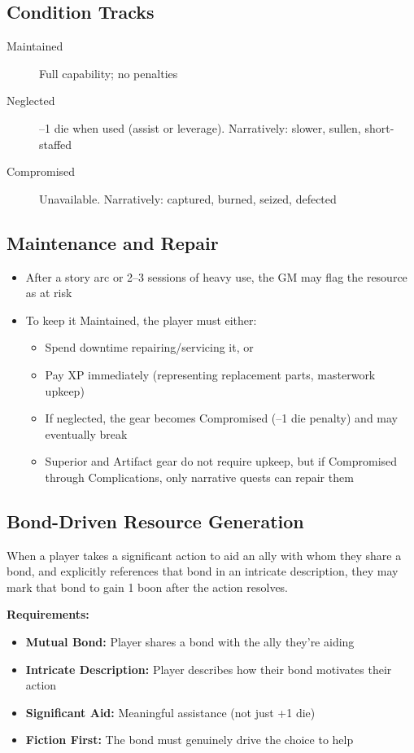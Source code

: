 \subsection{Condition Tracks}

\begin{description}
\item[Maintained] Full capability; no penalties
\item[Neglected] --1 die when used (assist or leverage). Narratively: slower, sullen, short-staffed
\item[Compromised] Unavailable. Narratively: captured, burned, seized, defected
\end{description}

\subsection{Maintenance and Repair}

\begin{itemize}
\item After a story arc or 2--3 sessions of heavy use, the GM may flag the resource as at risk
\item To keep it Maintained, the player must either:
  \begin{itemize}
  \item Spend downtime repairing/servicing it, or
  \item Pay XP immediately (representing replacement parts, masterwork upkeep)
  \item If neglected, the gear becomes Compromised (--1 die penalty) and may eventually break
  \item Superior and Artifact gear do not require upkeep, but if Compromised through Complications, only narrative quests can repair them
  \end{itemize}
\end{itemize}

\subsection{Bond-Driven Resource Generation}
When a player takes a significant action to aid an ally with whom they share a bond, and explicitly references that bond in an intricate description, they may mark that bond to gain 1 boon after the action resolves.

\textbf{Requirements:}
\begin{itemize}
    \item \textbf{Mutual Bond:} Player shares a bond with the ally they're aiding
    \item \textbf{Intricate Description:} Player describes how their bond motivates their action
    \item \textbf{Significant Aid:} Meaningful assistance (not just +1 die)
    \item \textbf{Fiction First:} The bond must genuinely drive the choice to help
\end{itemize}

